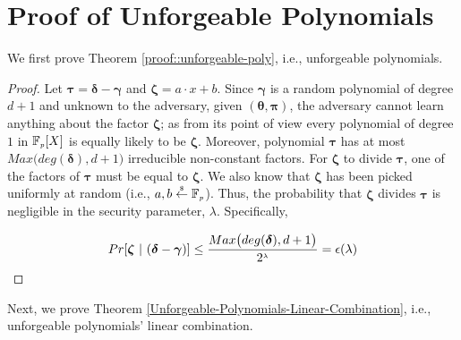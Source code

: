


\section{Proof of Unforgeable Polynomials}\label{sec::proof-of-unforgeable-polys}




We first prove Theorem \ref{proof::unforgeable-poly}, i.e., unforgeable polynomials.  


\begin{proof}

Let $\bm\tau=\bm\delta-\bm\gamma$ and $\bm\zeta=a\cdot x+b$. Since $\bm\gamma$ is a random polynomial of degree $d+1$ and unknown to the adversary, given $(\bm\theta, \bm\pi)$,  the adversary cannot learn anything about the factor $\bm\zeta$; as from its point of view every polynomial of degree $1$ in $\mathbb{F}_{\scriptscriptstyle p}[X]$ is equally likely to be $\bm\zeta$. Moreover,  polynomial $\bm\tau$ has at most $Max\big(deg(\bm\delta), d+1\big)$ irreducible non-constant factors.  For $\bm\zeta $ to divide $\bm\tau$,  one of the factors of $\bm\tau$ must be equal to $\bm\zeta$. We  also know that $\bm\zeta$ has been picked uniformly at random (i.e., $a,b
\stackrel{\scriptscriptstyle \$}\leftarrow \mathbb F_{\scriptscriptstyle p}$). Thus, the probability that $\bm\zeta $ divides $\bm\tau$ is negligible in the security parameter, $\lambda$. Specifically,

$$Pr[ \bm\zeta \ | \ (\bm\delta-\bm\gamma)]\leq \frac{Max\big(deg(\bm\delta), d+1\big)} {2^{\st \lambda}}=\negl(\lambda)$$
\end{proof} 



 
 

 
Next, we prove Theorem \ref{Unforgeable-Polynomials-Linear-Combination}, i.e., unforgeable polynomials' linear combination.  
 
